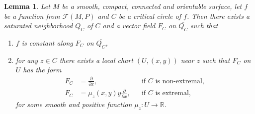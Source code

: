 \documentclass[10pt,a4paper]{amsart}
\newtheorem{lemma}{Lemma}
\newcommand{\F}{\mathcal{F}(M,P)}
\newcommand{\bbR}{\mathbb{R}}
\newcommand{\textr}[1]{\textcolor{black}{#1}}
\begin{document}
\begin{lemma}\label{lm:vector-field-FC}
	Let $M$ be a smooth, compact, connected and \textr{orientable} surface, let $f$ be a function from $\F$ and $C$ be a critical circle of $f$. Then there exists a saturated neighborhood $Q_C$ of $C$ and a vector field $F_C$ on $\overline{Q_C}$ such that 
	\begin{enumerate}
		\item $f$ is constant along $F_C$ on $\overline{Q_C}$,
		\item for any $z\in C$ there exists a local chart $(U,(x,y))$ near $z$ such that $F_C$ on $U$ has the form
		\begin{align}
			F_C &= \frac{\partial}{\partial x},&& \text{if $C$ is non-extremal},\label{eq:FC-non-extremal}\\
			F_C &= \mu_z(x,y)y\frac{\partial }{\partial x}, && \text{if $C$ is extremal}\label{eq:FC-extremal},
		\end{align}
		for some smooth and positive function $\mu_z:U\to \bbR$.
	\end{enumerate}
\end{lemma}
\end{document}
